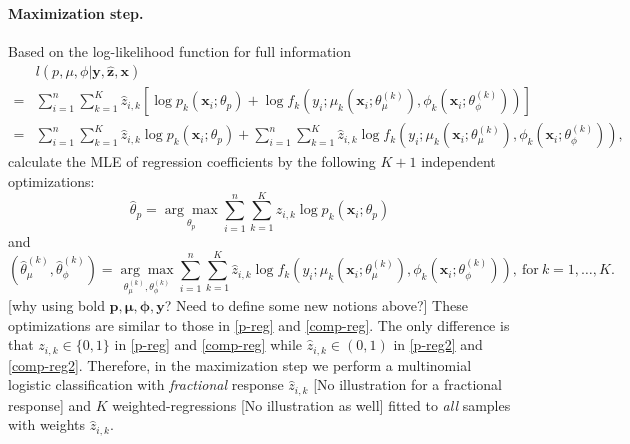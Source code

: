 \documentclass[11pt]{article}
\numberwithin{equation}{section}
\def\bx{\boldsymbol{x}}
\def\by{\boldsymbol{y}}
\def\bp{\boldsymbol{p}}
\def\bmu{\boldsymbol{\mu}}
\def\bphi{\boldsymbol{\phi}}
\def\bz{\boldsymbol{z}}
\begin{document}
\paragraph{Maximization step.}
	Based on the log-likelihood function for full information
	\begin{equation}
		\begin{aligned}
			&l(p,\mu,\phi|\by,\hat{\bz},\bx)\\
			=&\sum_{i=1}^n\sum_{k=1}^K \hat{z}_{i,k}\left[\log p_k(\bx_i;\theta_p) + \log f_k\left(y_i;\mu_k\left(\bx_i;\theta_\mu^{(k)}\right),\phi_k\left(\bx_i;\theta_\phi^{(k)}\right)\right)\right]\\
			=&\sum_{i=1}^n\sum_{k=1}^K \hat{z}_{i,k}\log p_k(\bx_i;\theta_p) + \sum_{i=1}^n\sum_{k=1}^K \hat{z}_{i,k}\log f_k\left(y_i;\mu_k\left(\bx_i;\theta_\mu^{(k)}\right),\phi_k\left(\bx_i;\theta_\phi^{(k)}\right)\right),
		\end{aligned}
	\end{equation}
 calculate the MLE of regression coefficients by the following $K+1$ independent optimizations:
 	\begin{equation}\label{p-reg2}
 	\hat{\theta}_p=\underset{\theta_p}{\arg\max}\sum_{i=1}^n\sum_{k=1}^K\hat{z}_{i,k}\log p_k(\bx_i;\theta_p)
 \end{equation}
 and
 \begin{equation}\label{comp-reg2}
 	\left(\hat{\theta}_\mu^{(k)},\hat{\theta}_\phi^{(k)}\right)=\underset{\theta^{(k)}_\mu,\theta^{(k)}_\phi}{\arg\max}\sum_{i=1}^n\sum_{k=1}^K\hat{z}_{i,k}\log f_k\left(y_i;\mu_k\left(\bx_i;\theta_\mu^{(k)}\right),\phi_k\left(\bx_i;\theta_\phi^{(k)}\right)\right), ~\text{for} ~ k=1,\ldots,K.
 \end{equation}
{\color{blue}[why using bold $\bp,\bmu,\bphi,\by$? Need to define some new notions above?]} These optimizations are similar to those in \eqref{p-reg} and \eqref{comp-reg}. 
The only difference is that ${z}_{i,k}\in\{0,1\}$ in \eqref{p-reg} and \eqref{comp-reg} while $\hat{z}_{i,k}\in(0,1)$ in  \eqref{p-reg2} and \eqref{comp-reg2}.
Therefore, in the maximization step we perform a multinomial logistic classification with {\it fractional} response $\hat{z}_{i,k}$ {\color{blue}[No illustration for a fractional response]} and $K$ {weighted}-regressions {\color{blue}[No illustration as well]} fitted to {\it all} samples with weights $\hat{z}_{i,k}$.
\end{document}

